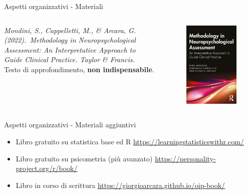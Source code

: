\documentclass[
  ignorenonframetext,
]{beamer}
\begin{document}
\begin{frame}{Aspetti organizzativi - Materiali}
\label{aspetti-organizzativi---materiali-1}
\begin{columns}
\small
\emph{Mondini, S., Cappelletti, M., \& Arcara, G. (2022). Methodology in Neuropsychological Assessment: An Interpretative Approach to Guide Clinical Practice. Taylor \& Francis.}\\
\vspace{1em}
Testo di approfondimento, \textbf{non indispensabile}.


\begin{figure}
\includegraphics[scale=0.5]{Figures/Methodology_book.png}
\end{figure}

\end{columns}
\end{frame}

\begin{frame}{Aspetti organizzativi - Materiali aggiuntivi}
\label{aspetti-organizzativi---materiali-aggiuntivi}
\begin{itemize}
\item
  Libro gratuito su statistica base ed R
  \href{https://learningstatisticswithr.com/}{\underline{https://learningstatisticswithr.com/}}
\item
  Libro gratuito su psicometria (più avanzato)
  \href{https://personality-project.org/r/book/}{\underline{https://personality-project.org/r/book/}}
\item
  Libro in corso di scrittura
  \href{https://giorgioarcara.github.io/oip-book/}{\underline{https://giorgioarcara.github.io/oip-book/}}
\end{itemize}
\end{frame}
\end{document}
